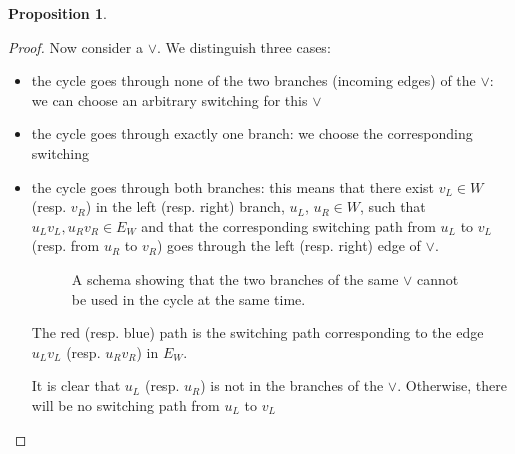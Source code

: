 \documentclass[conference,twosided,10pt]{IEEEtran}
\theoremstyle{definition}
\newtheorem{proposition}[thm]{Proposition}
\newcommand{\cor}{\vee}
\begin{document}
\begin{proposition}
\begin{proof}
  Now consider a $\cor$. We distinguish three cases:
  \begin{itemize}
    \item the cycle goes through none of the two branches (incoming edges) of
	    the $\cor$: we can choose an
	    arbitrary switching for this $\cor$
    \item the cycle goes through exactly one branch: we choose the corresponding
	    switching
    \item the cycle goes through both branches:
	    this means that there exist $v_L \in W$ (resp. $v_R$) in the left
		  (resp. right) branch, $u_L$, $u_R \in W$, such that
		  $u_Lv_L, u_Rv_R \in E_W$ and that the corresponding switching
		  path from $u_L$ to $v_L$ (resp. from $u_R$ to $v_R$) goes
		  through the left (resp. right) edge of $\cor$.

\begin{figure}[h]
    \begin{center}	
    
    \caption{A schema showing that the two branches of the same $\cor$ cannot be
	    used in the cycle at the same time.}
\end{center}
\end{figure}
    
    The red (resp. blue) path is the switching path corresponding to the edge $u_Lv_L$ (resp. $u_Rv_R$) in $E_W$.  
    
    It is clear that $u_L$ (resp. $u_R$) is not in the branches of the
	 $\cor$. Otherwise, there will be no switching path from $u_L$ to $v_L$ 


\end{itemize}
\end{proof}
\end{proposition}
\end{document}
